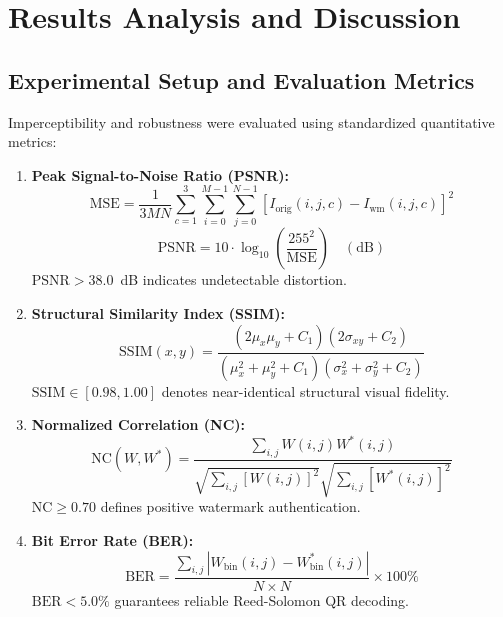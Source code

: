 \documentclass[12pt,a4paper]{report}
\begin{document}
\chapter{Results Analysis and Discussion}

\section{Experimental Setup and Evaluation Metrics}
Imperceptibility and robustness were evaluated using standardized quantitative metrics:
\begin{enumerate}
    \item \textbf{Peak Signal-to-Noise Ratio (PSNR):}
    \begin{equation}
        \text{MSE} = \frac{1}{3MN} \sum_{c=1}^3 \sum_{i=0}^{M-1} \sum_{j=0}^{N-1} \left[ I_{\text{orig}}(i,j,c) - I_{\text{wm}}(i,j,c) \right]^2
    \end{equation}
    \begin{equation}
        \text{PSNR} = 10 \cdot \log_{10} \left( \frac{255^2}{\text{MSE}} \right) \quad (\text{dB})
    \end{equation}
    $\text{PSNR} > 38.0$~dB indicates undetectable distortion.
    
    \item \textbf{Structural Similarity Index (SSIM):}
    \begin{equation}
        \text{SSIM}(x, y) = \frac{(2\mu_x \mu_y + C_1)(2\sigma_{xy} + C_2)}{(\mu_x^2 + \mu_y^2 + C_1)(\sigma_x^2 + \sigma_y^2 + C_2)}
    \end{equation}
    $\text{SSIM} \in [0.98, 1.00]$ denotes near-identical structural visual fidelity.
    
    \item \textbf{Normalized Correlation (NC):}
    \begin{equation}
        \text{NC}(W, W^*) = \frac{\sum_{i,j} W(i,j) W^*(i,j)}{\sqrt{\sum_{i,j} [W(i,j)]^2} \sqrt{\sum_{i,j} [W^*(i,j)]^2}}
    \end{equation}
    $\text{NC} \ge 0.70$ defines positive watermark authentication.
    
    \item \textbf{Bit Error Rate (BER):}
    \begin{equation}
        \text{BER} = \frac{\sum_{i,j} \left| W_{\text{bin}}(i,j) - W_{\text{bin}}^*(i,j) \right|}{N \times N} \times 100\%
    \end{equation}
    $\text{BER} < 5.0\%$ guarantees reliable Reed-Solomon QR decoding.
\end{enumerate}
\end{document}
